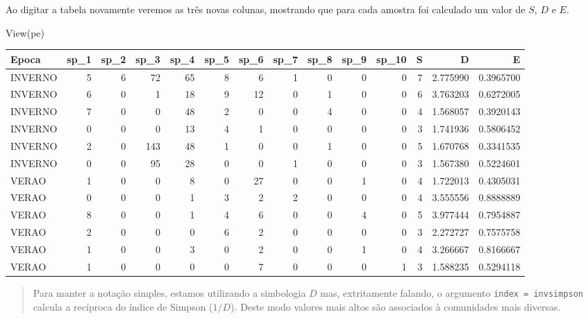 \documentclass[
]{book}
\newenvironment{Shaded}{\begin{snugshade}}{\end{snugshade}}
\newcommand{\FunctionTok}[1]{\textcolor[rgb]{0.00,0.00,0.00}{#1}}
\newcommand{\NormalTok}[1]{#1}
\begin{document}
Ao digitar a tabela novamente veremos as três novas colunas, mostrando que para cada amostra foi calculado um valor de \(S\), \(D\) e \(E\).

\begin{Shaded}
\begin{Highlighting}[]
\FunctionTok{View}\NormalTok{(pe)}
\end{Highlighting}
\end{Shaded}

\begin{table}
\centering\begingroup\fontsize{10}{12}\selectfont

\begin{tabular}{l|r|r|r|r|r|r|r|r|r|r|r|r|r}
\hline
Epoca & sp\_1 & sp\_2 & sp\_3 & sp\_4 & sp\_5 & sp\_6 & sp\_7 & sp\_8 & sp\_9 & sp\_10 & S & D & E\\
\hline
INVERNO & 5 & 6 & 72 & 65 & 8 & 6 & 1 & 0 & 0 & 0 & 7 & 2.775990 & 0.3965700\\
\hline
INVERNO & 6 & 0 & 1 & 18 & 9 & 12 & 0 & 1 & 0 & 0 & 6 & 3.763203 & 0.6272005\\
\hline
INVERNO & 7 & 0 & 0 & 48 & 2 & 0 & 0 & 4 & 0 & 0 & 4 & 1.568057 & 0.3920143\\
\hline
INVERNO & 0 & 0 & 0 & 13 & 4 & 1 & 0 & 0 & 0 & 0 & 3 & 1.741936 & 0.5806452\\
\hline
INVERNO & 2 & 0 & 143 & 48 & 1 & 0 & 0 & 1 & 0 & 0 & 5 & 1.670768 & 0.3341535\\
\hline
INVERNO & 0 & 0 & 95 & 28 & 0 & 0 & 1 & 0 & 0 & 0 & 3 & 1.567380 & 0.5224601\\
\hline
VERAO & 1 & 0 & 0 & 8 & 0 & 27 & 0 & 0 & 1 & 0 & 4 & 1.722013 & 0.4305031\\
\hline
VERAO & 0 & 0 & 0 & 1 & 3 & 2 & 2 & 0 & 0 & 0 & 4 & 3.555556 & 0.8888889\\
\hline
VERAO & 8 & 0 & 0 & 1 & 4 & 6 & 0 & 0 & 4 & 0 & 5 & 3.977444 & 0.7954887\\
\hline
VERAO & 2 & 0 & 0 & 0 & 6 & 2 & 0 & 0 & 0 & 0 & 3 & 2.272727 & 0.7575758\\
\hline
VERAO & 1 & 0 & 0 & 3 & 0 & 2 & 0 & 0 & 1 & 0 & 4 & 3.266667 & 0.8166667\\
\hline
VERAO & 1 & 0 & 0 & 0 & 0 & 7 & 0 & 0 & 0 & 1 & 3 & 1.588235 & 0.5294118\\
\hline
\end{tabular}
\endgroup{}
\end{table}

\begin{quote}
Para manter a notação simples, estamos utilizando a simbologia \(D\) mas, extritamente falando, o argumento \texttt{index\ =\ \textquotesingle{}invsimpson\textquotesingle{}} calcula a recíproca do índice de Simpson (\(1/D\)). Deste modo valores mais altos são associados à comunidades mais diversas.
\end{quote}
\end{document}
